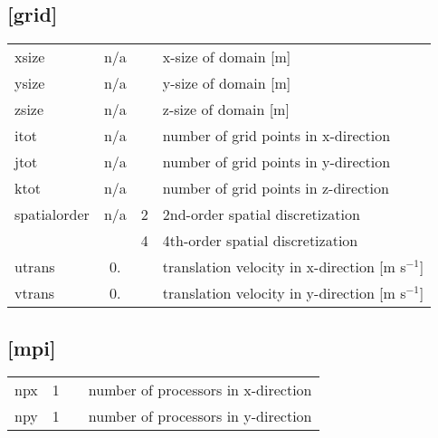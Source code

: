\documentclass[a4paper,10pt]{extarticle}
\begin{document}
\subsection*{[grid]}
\tablelasttail{\hline}
\begin{supertabular}{lccl}
xsize         & n/a   &   & x-size of domain [m]\\
ysize         & n/a   &   & y-size of domain [m]\\
zsize         & n/a   &   & z-size of domain [m]\\
itot          & n/a   &   & number of grid points in x-direction \\
jtot          & n/a   &   & number of grid points in y-direction \\
ktot          & n/a   &   & number of grid points in z-direction \\
spatialorder  & n/a   & 2 & 2nd-order spatial discretization \\
              &       & 4 & 4th-order spatial discretization \\
utrans        & 0.    &   & translation velocity in x-direction [m s$^{-1}$] \\
vtrans        & 0.    &   & translation velocity in y-direction [m s$^{-1}$] \\
\end{supertabular}
\subsection*{[mpi]}
\tablelasttail{\hline}
\begin{supertabular}{lccl}
npx           & 1     & & number of processors in x-direction \\
npy           & 1     & & number of processors in y-direction \\
\end{supertabular}
\end{document}

